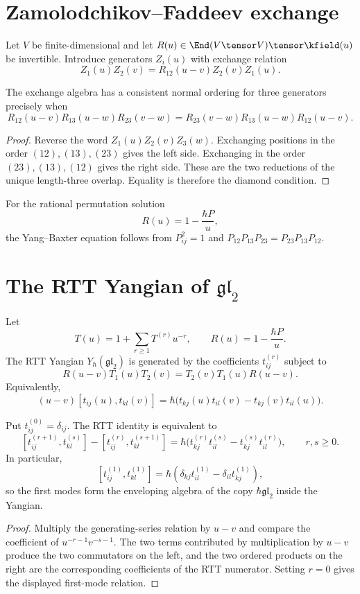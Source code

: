 \chapter{Zamolodchikov--Faddeev exchange}
Let $V$ be finite-dimensional and let $R(u)\in\End(V\tensor V)\tensor\kfield(u)$ be invertible. Introduce generators $Z_i(u)$ with exchange relation
\[
 Z_1(u)Z_2(v)=R_{12}(u-v)Z_2(v)Z_1(u).
\]

\begin{theorem}
The exchange algebra has a consistent normal ordering for three generators precisely when
\[
 R_{12}(u-v)R_{13}(u-w)R_{23}(v-w)
 =R_{23}(v-w)R_{13}(u-w)R_{12}(u-v).
\]
\end{theorem}
\begin{proof}
Reverse the word $Z_1(u)Z_2(v)Z_3(w)$. Exchanging positions in the order $(12),(13),(23)$ gives the left side. Exchanging in the order $(23),(13),(12)$ gives the right side. These are the two reductions of the unique length-three overlap. Equality is therefore the diamond condition.
\end{proof}

For the rational permutation solution
\[
 R(u)=1-\frac{\hbar P}{u},
\]
the Yang--Baxter equation follows from $P_{ij}^2=1$ and
$P_{12}P_{13}P_{23}=P_{23}P_{13}P_{12}$.

\chapter{The RTT Yangian of \texorpdfstring{$\mathfrak{gl}_2$}{gl2}}
Let
\[
 T(u)=1+\sum_{r\ge1}T^{(r)}u^{-r},
 \qquad R(u)=1-\frac{\hbar P}{u}.
\]
The RTT Yangian $Y_\hbar(\mathfrak{gl}_2)$ is generated by the coefficients $t_{ij}^{(r)}$ subject to
\[
 R(u-v)T_1(u)T_2(v)=T_2(v)T_1(u)R(u-v).
\]
Equivalently,
\[
 (u-v)[t_{ij}(u),t_{kl}(v)]
 =\hbar\bigl(t_{kj}(u)t_{il}(v)-t_{kj}(v)t_{il}(u)\bigr).
\]

\begin{proposition}
Put $t_{ij}^{(0)}=\delta_{ij}$. The RTT identity is equivalent to
\[
 [t_{ij}^{(r+1)},t_{kl}^{(s)}]-[t_{ij}^{(r)},t_{kl}^{(s+1)}]
 =\hbar\bigl(t_{kj}^{(r)}t_{il}^{(s)}-t_{kj}^{(s)}t_{il}^{(r)}\bigr),
 \qquad r,s\ge0.
\]
In particular,
\[
 [t_{ij}^{(1)},t_{kl}^{(1)}]
 =\hbar(\delta_{kj}t_{il}^{(1)}-\delta_{il}t_{kj}^{(1)}),
\]
so the first modes form the enveloping algebra of the copy $\hbar\mathfrak{gl}_2$ inside the Yangian.
\end{proposition}
\begin{proof}
Multiply the generating-series relation by $u-v$ and compare the coefficient of $u^{-r-1}v^{-s-1}$. The two terms contributed by multiplication by $u-v$ produce the two commutators on the left, and the two ordered products on the right are the corresponding coefficients of the RTT numerator. Setting $r=0$ gives the displayed first-mode relation.
\end{proof}

